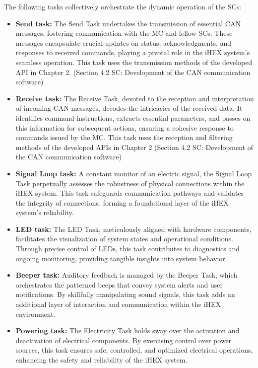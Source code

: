 The following tasks collectively orchestrate the dynamic operation of the SCs:
\begin{itemize}
    \item \textbf{Send task:} The Send Task undertakes the transmission of essential CAN messages, fostering communication with the MC and fellow SCs. These messages encapsulate crucial updates on status, acknowledgments, and responses to received commands, playing a pivotal role in the iHEX system's seamless operation. This task uses the transmission methods of the developed API in Chapter 2. (Section 4.2 SC: Development of the CAN communication software)
    \item \textbf{Receive task:} The Receive Task, devoted to the reception and interpretation of incoming CAN messages, decodes the intricacies of the received data. It identifies command instructions, extracts essential parameters, and passes on this information for subsequent actions, ensuring a cohesive response to commands issued by the MC. This task uses the reception and filtering methods of the developed APIs in Chapter 2 (Section 4.2 SC: Development of the CAN communication software)
    \item \textbf{Signal Loop task:} A constant monitor of an electric signal, the Signal Loop Task perpetually assesses the robustness of physical connections within the iHEX system. This task safeguards communication pathways and validates the integrity of connections, forming a foundational layer of the iHEX system's reliability.
    \item \textbf{LED task:} The LED Task, meticulously aligned with hardware components, facilitates the visualization of system states and operational conditions. Through precise control of LEDs, this task contributes to diagnostics and ongoing monitoring, providing tangible insights into system behavior.
    \item \textbf{Beeper task:} Auditory feedback is managed by the Beeper Task, which orchestrates the patterned beeps that convey system alerts and user notifications. By skillfully manipulating sound signals, this task adds an additional layer of interaction and communication within the iHEX environment.
    \item \textbf{Powering task:} The Electricity Task holds sway over the activation and deactivation of electrical components. By exercising control over power sources, this task ensures safe, controlled, and optimized electrical operations, enhancing the safety and reliability of the iHEX system.
\end{itemize}

